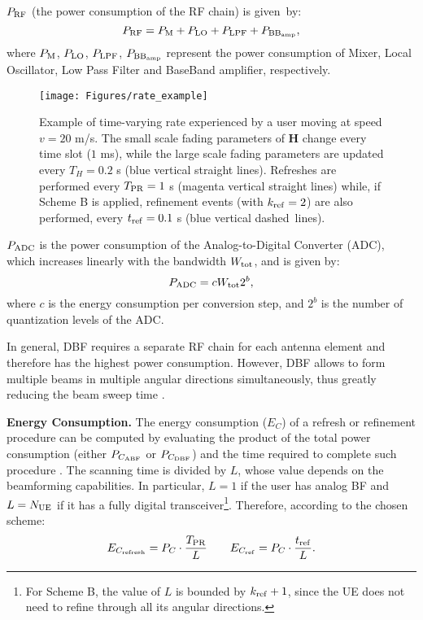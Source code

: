 \documentclass[conference]{IEEEtran}
\newlength\fheight
\newlength\fwidth
\def\beq{\begin{equation}}
\def\eeq{\end{equation}}
\newif\iftikz
\begin{document}
$P_{\rm RF}$  (the power consumption of the RF chain) is given~by:
\beq
P_{\rm RF} = P_{\rm M} + P_{\rm LO} + P_{\rm LPF} + P_{\rm BB_{\rm amp}},
\eeq
where $P_{\rm M}$, $P_{\rm LO}$, $P_{\rm LPF}$, $P_{\rm BB_{\rm amp}}$ represent the power consumption of Mixer, Local Oscillator, Low Pass Filter and BaseBand amplifier, respectively.

\begin{figure*}[t!]
	\centering
		\setlength{\belowcaptionskip}{0cm}
		\iftikz
		\setlength{\belowcaptionskip}{0cm}
		\setlength\fwidth{0.95\textwidth}
		\setlength\fheight{0.15\textwidth}
		
		\else
		\texttt{[image: Figures/rate\_example]}
		\fi
		\caption{Example of time-varying rate experienced by a user moving at  speed $v=20$ m/s. The small scale fading parameters of \textbf{H} change every time slot ($1$ ms), while the large scale fading parameters are updated every $T_{H}=0.2$ s (blue vertical straight lines). Refreshes are performed every $T_{\rm PR} = 1$ s (magenta vertical straight lines) while, if Scheme B is applied, refinement events (with $k_{\rm ref}=2$) are also performed, every $t_{\rm ref}=0.1$ s (blue vertical dashed~lines).}
		\vspace{-1.2em}
		\label{fig:rate_example}
\end{figure*}

$P_{\rm ADC}$ is the power consumption of the Analog-to-Digital Converter (ADC), which increases
linearly with the bandwidth $W_{\rm tot}$, and is given by:
\begin{equation}
P_{\rm ADC} = c W_{\rm tot} 2^b,
\end{equation}
where $c$ is the energy consumption per conversion step, and $2^b$ is the number of quantization levels of the ADC.

In general, DBF requires a separate RF chain for each antenna element and therefore has the highest power consumption. However, DBF allows to form multiple beams in multiple angular directions simultaneously, thus greatly reducing the  beam sweep  time \cite{abbas2016_ECIA}.

\textbf{Energy Consumption.}
The energy consumption ($E_C$) of a refresh or refinement procedure can be computed by evaluating the product of the total power consumption (either $P_{C_{\rm ABF}}$ or $P_{C_{\rm DBF}}$) and the time required to complete such procedure \cite{abbas2016_ECIA}. 
The scanning time is divided by $L$, whose value depends on the beamforming capabilities. In particular, $L = 1$ if the user has analog BF and $L = N_{\rm UE}$ if it has a fully digital transceiver\footnote{\label{footnoteL}For Scheme B, the value of $L$ is bounded by $k_{\rm ref}+1$, since the UE does not need to refine through all its angular directions.}. Therefore, according to the chosen scheme:
\begin{equation}
E_{C_{\rm refresh}} = P_C \cdot \frac{T_{\rm PR}}{L} \qquad E_{C_{\rm ref} }= P_C \cdot \frac{t_{\rm ref}}{L}.
\label{eq:EC}
\end{equation}
\end{document}
